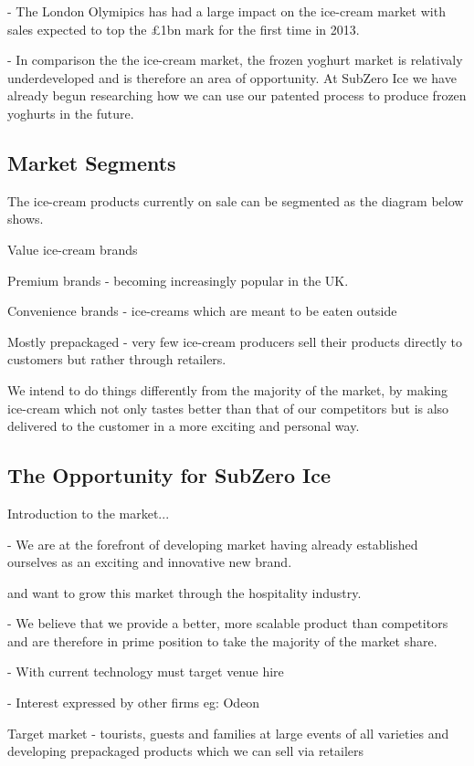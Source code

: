 \documentclass{article}
\begin{document}
- The London Olymipics has had a large impact on the ice-cream market with sales expected to top the £1bn mark for the first time in 2013.

- In comparison the the ice-cream market, the frozen yoghurt market is relativaly underdeveloped and is therefore an area of opportunity. At SubZero Ice we have already begun researching how we can use our patented process to produce frozen yoghurts in the future.


  \subsection{Market Segments}

  The ice-cream products currently on sale can be segmented as the diagram below shows.

  Value ice-cream brands

  Premium brands - becoming increasingly popular in the UK.

  Convenience brands - ice-creams which are meant to be eaten outside

  Mostly prepackaged - very few ice-cream producers sell their products directly to customers but rather through retailers.

  We intend to do things differently from the majority of the market, by making ice-cream which not only tastes better than that of our competitors but is also delivered to the customer in a more exciting and personal way.


  \subsection{The Opportunity for SubZero Ice}
  Introduction to the market...

   - We are at the forefront of developing market having already established ourselves as an exciting and innovative new brand.

    and want to grow this market through the hospitality industry.

 - We believe that we provide a better, more scalable product than competitors and are therefore in prime position to take the majority of the market share.

   - With current technology must target venue hire

   - Interest expressed by other firms eg: Odeon

  Target market - tourists, guests and families at large events of all varieties and developing prepackaged products which we can sell via retailers
\end{document}
